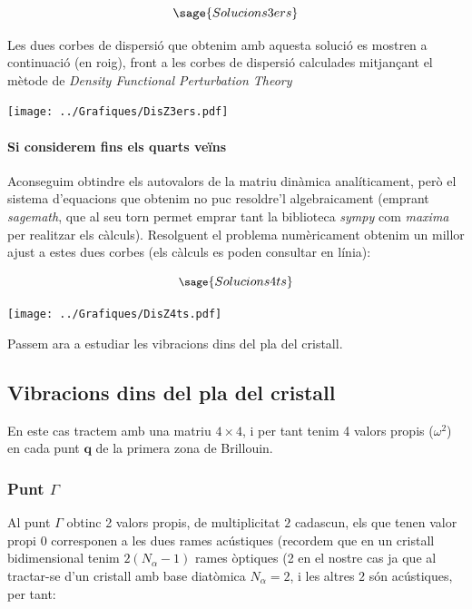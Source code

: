 \documentclass[12pt]{article} %
\let\vec\mathbf %
\begin{document}
\begin{equation}
 \sage{Solucions3ers}
\end{equation}

Les dues corbes de dispersió que obtenim amb aquesta solució es mostren a continuació (en roig), front a les corbes de dispersió calculades mitjançant el mètode de \emph{Density Functional Perturbation Theory}

\begin{center}
\texttt{[image: ../Grafiques/DisZ3ers.pdf]}
\end{center}

\paragraph{Si considerem fins els quarts veïns}

Aconseguim obtindre els autovalors de la matriu dinàmica analíticament, però el sistema d'equacions que obtenim no puc resoldre'l algebraicament (emprant \textit{sagemath}, que al seu torn permet emprar tant la biblioteca \textit{sympy} com \textit{maxima} per realitzar els càlculs).  Resolguent el problema numèricament obtenim un millor ajust a estes dues corbes (els càlculs es poden consultar en línia):

\begin{equation}\small{
 \sage{Solucions4ts}}
\end{equation}

\begin{center}
\texttt{[image: ../Grafiques/DisZ4ts.pdf]}
\end{center}

Passem ara a estudiar les vibracions dins del pla del cristall.

\subsection{Vibracions dins del pla del cristall}

En este cas tractem amb una matriu $4\times 4$, i per tant tenim 4 valors propis ($\omega^2$) en cada punt $\vec q$ de la primera zona de Brillouin.


\subsubsection{Punt $\Gamma$}

Al punt $\Gamma$ obtinc 2 valors propis, de multiplicitat $2$ cadascun, els que tenen valor propi $0$ corresponen a les dues rames acústiques (recordem que en un cristall bidimensional tenim $2(N_\alpha -1)$ rames òptiques (2 en el nostre cas ja que al tractar-se d'un cristall amb base diatòmica $N_\alpha=2$, i les altres $2$ són acústiques, per tant: 
\end{document}
